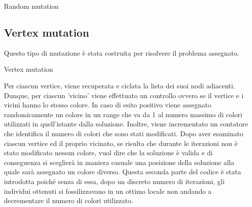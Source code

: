\documentclass[12pt]{article}
\begin{document}
\begin{enumerate}
\begin{algorithm}
\caption{Random mutation}\label{alg:cap}
\begin{algorithmic} 
   
    
\end{algorithmic}
\end{algorithm}


\subsection{Vertex mutation}
Questo tipo di mutazione è stata costruita per risolvere il problema assegnato. 

\begin{algorithm}
\caption{Vertex mutation}\label{alg:cap}
\begin{algorithmic} 
                \EndIf
             \EndFor
        \EndFor
          \Else
          \EndIf
\end{algorithmic}
\end{algorithm}


\noindent Per ciascun vertice, viene recuperata e ciclata la lista dei suoi nodi adiacenti. Dunque, per ciascun 'vicino' viene effettuato un controllo ovvero se il vertice e i vicini hanno lo stesso colore. In caso di esito positivo viene assegnato randomicamente un colore in un range che va da 1 al numero massimo di colori utilizzati in quell'istante dalla soluzione. Inoltre, viene incrementato un contatore che identifica il numero di colori che sono stati modificati. Dopo aver esaminato ciascun vertice ed il proprio vicinato, se risulta che durante le iterazioni non è stato modificato nessun colore, vuol dire che la soluzione è valida e di conseguenza si sceglierà in maniera casuale una posizione della soluzione alla quale sarà assegnato un colore diverso. Questa seconda parte del codice è stata introdotta poiché senza di essa, dopo un discreto numero di iterazioni, gli individui ottenuti si fossilizzavano in un ottimo locale non andando a decrementare il numero di colori utilizzato.




\end{enumerate}
\end{document}
